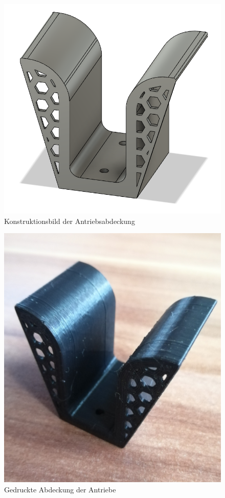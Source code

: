 \begin{minipage}[b]{0.49\textwidth}
\centering
\begin{figure}[H] %
\includegraphics[width=.8\textwidth]{sec2/images/3DAnbaukomponenten/Konstruktionsbilder/AntriebsabdeckungKonstruktion} 
\centering
\captionsetup{width=.9\textwidth}
\caption[Konstruktionsbild der Antriebsabdeckung]{Konstruktionsbild der Antriebsabdeckung}
\centering
\label{fig:KonstruktionAntriebsabdeckung}
\end{figure}
\end{minipage}
\begin{minipage}[b]{0.49\textwidth}
\begin{figure}[H] %
\includegraphics[width=.8\textwidth]{sec2/images/3DAnbaukomponenten/Druckbilder/AntriebsabdeckungDruck} 
\centering
\captionsetup{width=.9\textwidth}
\caption[Gedruckte Abdeckung der Antriebe]{Gedruckte Abdeckung der Antriebe}
\centering
\label{fig:DruckAntriebsabdeckung}
\end{figure}
\end{minipage}


